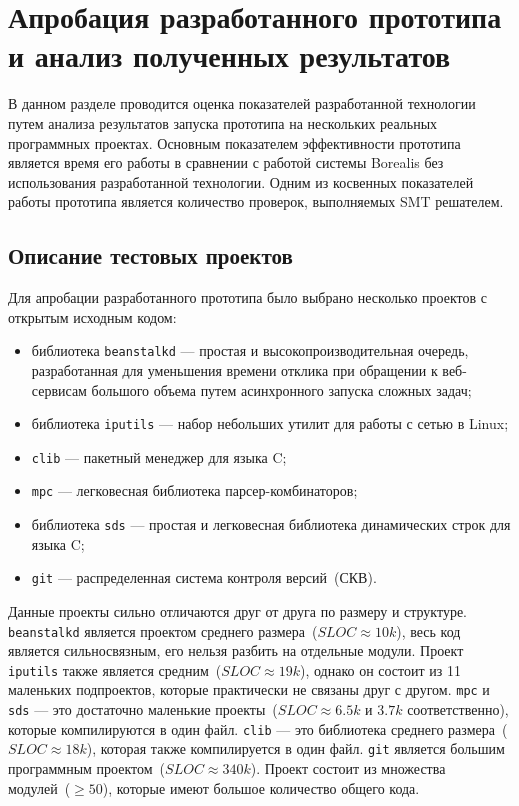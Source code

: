 \chapter{Апробация разработанного прототипа и анализ полученных результатов}
\label{chapter:testing}
В данном разделе проводится оценка показателей разработанной технологии путем 
анализа результатов запуска прототипа на нескольких реальных программных 
проектах. Основным показателем эффективности прототипа является время его работы
в сравнении с работой системы Borealis без использования разработанной технологии.
Одним из косвенных показателей работы прототипа является количество проверок,
выполняемых SMT решателем.

\section{Описание тестовых проектов}
Для апробации разработанного прототипа было выбрано несколько проектов с открытым
исходным кодом:
\begin{itemize}
\item библиотека \texttt{beanstalkd} --- простая и высокопроизводительная 
очередь, разработанная для уменьшения времени отклика при обращении к 
веб-сервисам большого объема путем асинхронного запуска сложных задач;
\item библиотека \texttt{iputils} --- набор небольших утилит для работы с
сетью в Linux;
\item \texttt{clib} --- пакетный менеджер для языка C;
\item \texttt{mpc} --- легковесная библиотека парсер-комбинаторов;
\item библиотека \texttt{sds} --- простая и легковесная библиотека динамических
строк для языка C;
\item \texttt{git} — распределенная система контроля версий~(СКВ).
\end{itemize}

Данные проекты сильно отличаются друг от друга по размеру и структуре. 
\texttt{beanstalkd} является проектом среднего размера~($SLOC \approx 10k$), 
весь код является сильносвязным, его нельзя разбить на отдельные модули. Проект 
\texttt{iputils} также является средним~($SLOC \approx 19k$), однако он состоит 
из 11 маленьких подпроектов, которые практически не связаны друг с другом. 
\texttt{mpc} и \texttt{sds} --- это достаточно маленькие проекты~($SLOC \approx 
6.5k$ и $3.7k$ соответственно), которые компилируются в один файл. \texttt{clib}
--- это библиотека среднего размера~($SLOC \approx 18k$), которая также 
компилируется в один файл. \texttt{git} является большим программным
проектом~($SLOC \approx 340k$). Проект состоит из множества модулей~($\ge 50$), 
которые имеют большое количество общего кода.

